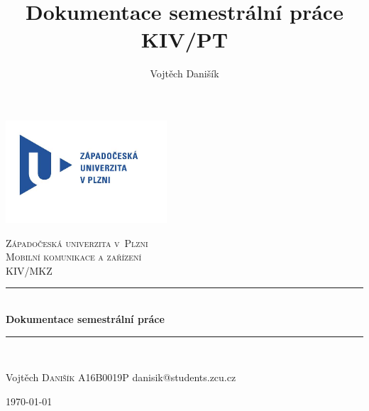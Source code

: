 \documentclass[12pt, a4paper]{article}
\title{\textbf{Dokumentace semestrální práce} \\KIV/PT}
\author{Vojtěch Danišík}
\begin{document}
\begin{titlepage} 
	\newcommand{\HRule}{\rule{\linewidth}{0.5mm}} 
	\begin{center}
	\includegraphics[width=6cm]{img/logo}\\
	\end{center}
	\textsc{\LARGE Západočeská univerzita v~Plzni}\\[1.5cm] 	
	\textsc{\Large Mobilní komunikace a zařízení}\\[0.5cm] 
	\textsc{\large KIV/MKZ}\\[0.5cm] 
	\HRule\\[0.4cm]
	{\huge\bfseries Dokumentace semestrální práce}\\[0.4cm] 
	\HRule\\[1.5cm]

	\begin{minipage}{0.4\textwidth}
		\begin{flushleft}
			\large
			Vojtěch \textsc{Danišík}\newline
			A16B0019P\newline
			danisik@students.zcu.cz
		\end{flushleft}
	\end{minipage}
	\vfill\vfill\vfill
	\begin{flushright}
	{\large\today}
	\end{flushright}
	\vfill 
\end{titlepage}
\newpage
\tableofcontents
\newpage
\end{document}
